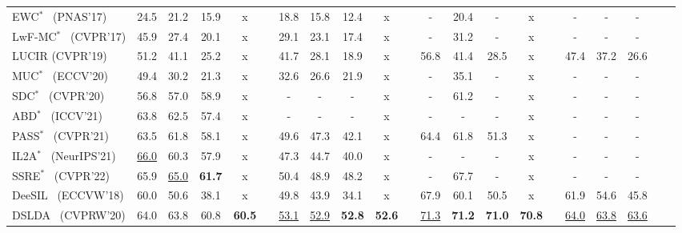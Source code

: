 \documentclass[10pt,twocolumn,letterpaper]{article}
\begin{document}
\begin{table*}[t]
\begin{center}
{\begin{tabular}{@{\kern0.5em}llccccccccccccccccccc@{\kern0.5em}}
EWC$^*$~\cite{kirkpatrick2017overcoming} \small (PNAS'17)    & 24.5 & 21.2 & 15.9 & x && 18.8 & 15.8 & 12.4 & x && -    & 20.4 & - & x  && - & - & - \\
LwF-MC$^*$~\cite{rebuffi2017_icarl} \small (CVPR'17) & 45.9 & 27.4 & 20.1 & x && 29.1 & 23.1 & 17.4 & x && -    & 31.2 & - & x  && - & - & - \\    
LUCIR \small (CVPR'19)      & 51.2 & 41.1 & 25.2 & x && 41.7 & 28.1 & 18.9 & x && 56.8 & 41.4 & 28.5  & x && 47.4 & 37.2 & 26.6 \\  
MUC$^*$~\cite{liu2020more} \small (ECCV'20)    & 49.4 & 30.2 & 21.3 & x && 32.6 & 26.6 & 21.9 & x && -    & 35.1 & - & x && - & - & - \\   
SDC$^*$~\cite{sdc_2020} \small (CVPR'20)    & 56.8 & 57.0 & 58.9 & x &&   -  & -    &-  & x  && -    & 61.2 & - & x && - & - & - \\   
ABD$^*$~\cite{smith2021always} \small (ICCV'21)    & 63.8 & 62.5 & 57.4 & x &&   -  & -    &- & x    && -    & - & - & x && - & - & - \\ 
PASS$^*$~\cite{zhu2021pass} \small (CVPR'21)   & 63.5 & 61.8 & 58.1 & x && 49.6 & 47.3 & 42.1 & x && 64.4   & 61.8 & {51.3} & x && - & - & - \\ 
IL2A$^*$~\cite{zhu2021class} \small (NeurIPS'21)& \underline{66.0} & 60.3 & 57.9 & x && 47.3 & 44.7 & 40.0  & x && - & - & - & x  && - & - & - \\ 
SSRE$^*$~\cite{zhu2022self} \small (CVPR'22)   & 65.9 & \underline{65.0} & \textbf{61.7} & x && {50.4} & {48.9} & {48.2} & x && -    & {67.7} &  - & x && - & - & - \\ 
\hline
DeeSIL~\cite{belouadah2018_deesil} \small (ECCVW'18)    & 60.0 & 50.6 & 38.1 & x && 49.8 & 43.9 & 34.1 & x &&  {67.9} & 60.1 & 50.5 & x && 61.9 & 54.6 & 45.8 \\

DSLDA~\cite{hayes2020_deepslda} \small (CVPRW'20)   & 64.0 & 63.8 & 60.8 & \textbf{60.5} && \underline{53.1} & \underline{52.9} & \textbf{52.8} & \textbf{52.6} && \underline{71.3}  & \textbf{71.2} &  \textbf{71.0} & \textbf{70.8} && \underline{64.0} & \underline{63.8} & \underline{63.6} \\


\end{tabular}}
\end{center}
\end{table*}
\end{document}
